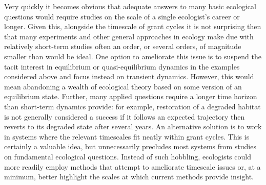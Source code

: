 \documentclass[11pt,a4paper,oneside]{article}
\begin{document}
Very quickly it becomes obvious that adequate answers to many basic ecological questions would require studies on the scale of a single ecologist's career or longer. Given this, alongside the timescale of grant cycles it is not surprising then that many experiments and other general approaches in ecology make due with relatively short-term studies often an order, or several orders, of magnitude smaller than would be ideal. One option to ameliorate this issue is to suspend the tacit interest in equilibrium or quasi-equilibrium dynamics in the examples considered above and focus instead on transient dynamics. However, this would mean abandoning a wealth of ecological theory based on some version of an equilibrium state. Further, many applied questions require a longer time horizon than short-term dynamics provide: for example, restoration of a degraded habitat is not generally considered a success if it follows an expected trajectory then reverts to its degraded state after several years. An alternative solution is to work in systems where the relevant timescales fit neatly within grant cycles. This is certainly a valuable idea, but unnecessarily precludes most systems from studies on fundamental ecological questions. Instead of such hobbling, ecologists could more readily employ methods that attempt to ameliorate timescale issues or, at a minimum, better highlight the scales at which current methods provide insight.\\
\end{document}
